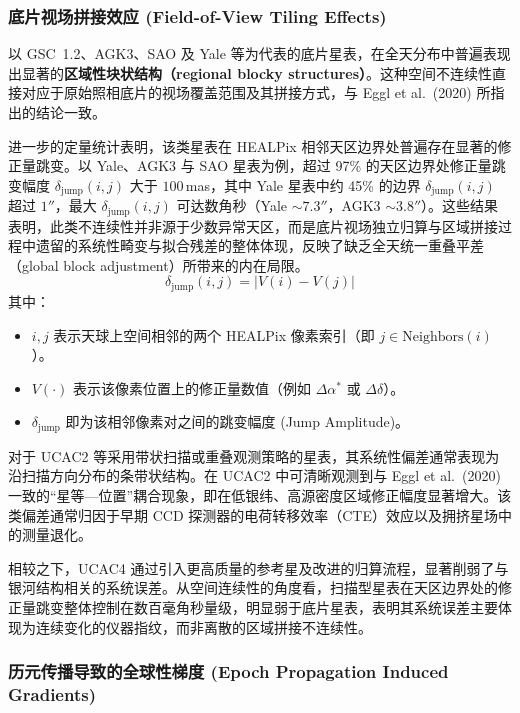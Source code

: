 \documentclass{aastex701}
\begin{document}
\subsubsection{底片视场拼接效应 (Field-of-View Tiling Effects)}

以 GSC~1.2、AGK3、SAO 及 Yale 等为代表的底片星表，在全天分布中普遍表现出显著的\textbf{区域性块状结构（regional blocky structures）}。这种空间不连续性直接对应于原始照相底片的视场覆盖范围及其拼接方式，与 Eggl et al.\ (2020) 所指出的结论一致。

进一步的定量统计表明，该类星表在 HEALPix 相邻天区边界处普遍存在显著的修正量跳变。以 Yale、AGK3 与 SAO 星表为例，超过 97\% 的天区边界处修正量跳变幅度 $\delta_{\text{jump}} (i, j)$ 大于 $100$\,mas，其中 Yale 星表中约 45\% 的边界 $\delta_{\text{jump}} (i, j)$ 超过 $1''$，最大 $\delta_{\text{jump}} (i, j)$ 可达数角秒（Yale $\sim7.3''$，AGK3 $\sim3.8''$）。这些结果表明，此类不连续性并非源于少数异常天区，而是底片视场独立归算与区域拼接过程中遗留的系统性畸变与拟合残差的整体体现，反映了缺乏全天统一重叠平差（global block adjustment）所带来的内在局限。
\begin{equation}
\delta_{\text{jump}} (i, j) = \left| V(i) - V(j) \right|
\end{equation}
其中：
\begin{itemize}
\item $i, j$ 表示天球上空间相邻的两个 HEALPix 像素索引（即 $j \in \text{Neighbors}(i)$）。
\item $V(\cdot)$ 表示该像素位置上的修正量数值（例如 $\Delta\alpha^*$ 或 $\Delta\delta$）。
\item $\delta_{\text{jump}}$ 即为该相邻像素对之间的跳变幅度 (Jump Amplitude)。
\end{itemize}

对于 UCAC2 等采用带状扫描或重叠观测策略的星表，其系统性偏差通常表现为沿扫描方向分布的条带状结构。在 UCAC2 中可清晰观测到与 Eggl et al.\ (2020) 一致的“星等—位置”耦合现象，即在低银纬、高源密度区域修正幅度显著增大。该类偏差通常归因于早期 CCD 探测器的电荷转移效率（CTE）效应以及拥挤星场中的测量退化。

相较之下，UCAC4 通过引入更高质量的参考星及改进的归算流程，显著削弱了与银河结构相关的系统误差。从空间连续性的角度看，扫描型星表在天区边界处的修正量跳变整体控制在数百毫角秒量级，明显弱于底片星表，表明其系统误差主要体现为连续变化的仪器指纹，而非离散的区域拼接不连续性。

\subsubsection{历元传播导致的全球性梯度 (Epoch Propagation Induced Gradients)}
\end{document}
